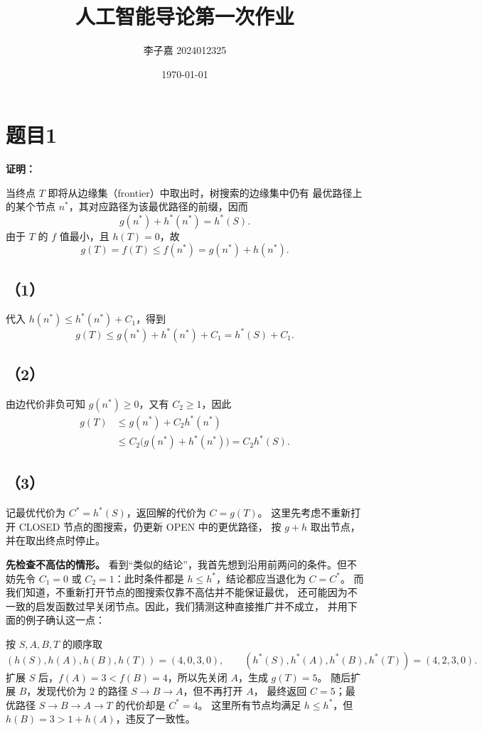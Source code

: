 \documentclass[utf8]{ctexart}
\title{\textbf{人工智能导论\quad 第一次作业}}
\date{\today}
\author{李子嘉 2024012325}
\theoremstyle{mystyle}
\begin{document}
\maketitle

\section*{题目1}
\textbf{证明：}

当终点 $T$ 即将从边缘集（frontier）中取出时，树搜索的边缘集中仍有
最优路径上的某个节点 $n^*$，其对应路径为该最优路径的前缀，因而
\[
  g(n^*)+h^*(n^*)=h^*(S).
\]
由于 $T$ 的 $f$ 值最小，且 $h(T)=0$，故
\[
  g(T)=f(T)\le f(n^*)=g(n^*)+h(n^*).
\]

\subsection*{（1）}
代入 $h(n^*)\le h^*(n^*)+C_1$，得到
\[
  g(T)\le g(n^*)+h^*(n^*)+C_1=h^*(S)+C_1.
\]

\subsection*{（2）}
由边代价非负可知 $g(n^*)\ge0$，又有 $C_2\ge1$，因此
\begin{align*}
  g(T)
  &\le g(n^*)+C_2h^*(n^*)\\
  &\le C_2\bigl(g(n^*)+h^*(n^*)\bigr)
   =C_2h^*(S).
\end{align*}

\newpage
\subsection*{（3）}
记最优代价为 $C^*=h^*(S)$，返回解的代价为 $C=g(T)$。
这里先考虑不重新打开 CLOSED 节点的图搜索，仍更新 OPEN 中的更优路径，
按 $g+h$ 取出节点，并在取出终点时停止。

\medskip
\noindent\textbf{先检查不高估的情形。}
看到“类似的结论”，我首先想到沿用前两问的条件。但不妨先令 $C_1=0$
或 $C_2=1$：此时条件都是 $h\le h^*$，结论都应当退化为 $C=C^*$。
而我们知道，不重新打开节点的图搜索仅靠不高估并不能保证最优，
还可能因为不一致的启发函数过早关闭节点。因此，我们猜测这种直接推广并不成立，
并用下面的例子确认这一点：
\begin{center}
\end{center}
按 $S,A,B,T$ 的顺序取
\[
 (h(S),h(A),h(B),h(T))=(4,0,3,0),\qquad
 (h^*(S),h^*(A),h^*(B),h^*(T))=(4,2,3,0).
\]
扩展 $S$ 后，$f(A)=3<f(B)=4$，所以先关闭 $A$，生成 $g(T)=5$。
随后扩展 $B$，发现代价为 $2$ 的路径 $S\to B\to A$，但不再打开 $A$，
最终返回 $C=5$；最优路径 $S\to B\to A\to T$ 的代价却是 $C^*=4$。
这里所有节点均满足 $h\le h^*$，但 $h(B)=3>1+h(A)$，违反了一致性。
\end{document}
